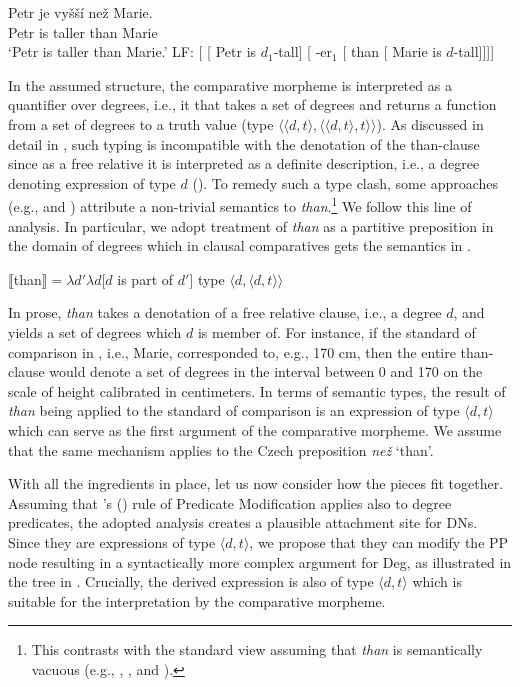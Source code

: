 \documentclass[output=paper,
modfonts,
hidelinks,
newtxmath
]{langscibook}
\begin{document}
\ea \ea \gll Petr je vyšší než Marie.\label{comp}\\
Petr is taller than Marie\\
\glt `Petr is taller than Marie.'
\ex LF: [ [ Petr is $d_1$-tall] [ -er$_1$ [ than [ Marie is $d$-tall]]]]\label{comp-LF}
\z \z

\noindent In the assumed structure, the comparative morpheme is interpreted as a quantifier over degrees, i.e., it that takes a set of degrees and returns a function from a set of degrees to a truth value (type $\langle \langle d,t\rangle,\langle \langle d,t\rangle,t\rangle\rangle$). As discussed in detail in \cite{pancheva2006phrasal}, such typing is incompatible with the denotation of the than-clause since as a free relative it is interpreted as a definite description, i.e., a degree denoting expression of type $d$ (\citealt{heim_degree_2000}). To remedy such a type clash, some approaches (e.g., \citealt{von_stechow_comparing_1984} and \citealt{rullmann1995maximality}) attribute a non-trivial semantics to \textit{than}.\footnote{This contrasts with the standard view assuming that \textit{than} is semantically vacuous (e.g., \citealt{heim_degree_2000}, \citealt{kennedy2001polar}, and \citealt{schwarzschild_wilkinson2002quantifiers}).} We follow this line of analysis. In particular, we adopt  treatment of \textit{than} as a partitive preposition in the domain of degrees which in clausal comparatives gets the semantics in .

\ea $\llbracket$than$\rrbracket = \lambda d'\lambda d[d$ is part of $d']$ \hfill{type $\langle d,\langle d,t\rangle\rangle$}\label{than-semantics}
\z

\noindent In prose, \textit{than} takes a denotation of a free relative clause, i.e., a degree $d$, and yields a set of degrees which $d$ is member of. For instance, if the standard of comparison in , i.e., Marie, corresponded to, e.g., 170 cm, then the entire than-clause would denote a set of degrees in the interval between 0 and 170 on the scale of height calibrated in centimeters. In terms of semantic types, the result of \textit{than} being applied to the standard of comparison is an expression of type $\langle d,t\rangle$ which can serve as the first argument of the comparative morpheme. We assume that the same mechanism applies to the Czech preposition \textit{než} `than'.

With all the ingredients in place, let us now consider how the pieces fit together. Assuming that \citeauthor{heim_kratzer1998semantics}'s (\citeyear{heim_kratzer1998semantics}) rule of Predicate Modification applies also to degree predicates, the adopted analysis creates a plausible attachment site for DNs. Since they are expressions of type $\langle d,t\rangle$, we propose that they can modify the PP node resulting in a syntactically more complex argument for Deg, as illustrated in the tree in . Crucially, the derived expression is also of type $\langle d,t\rangle$ which is suitable for the interpretation by the comparative morpheme.
\end{document}
